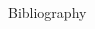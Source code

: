 \documentclass[final]{beamer}
\begin{document}
\begin{frame}[t]
\begin{columns}[t]
\begin{column}{.465\textwidth}
\begin{block}{Bibliography}
\begin{scriptsize}
\begin{thebibliography}{9}
\end{thebibliography}


\end{scriptsize}

\end{block}



\end{column} %

\begin{column}{.015\textwidth}\end{column} %

\end{columns} %

\end{frame} %
\end{document}
